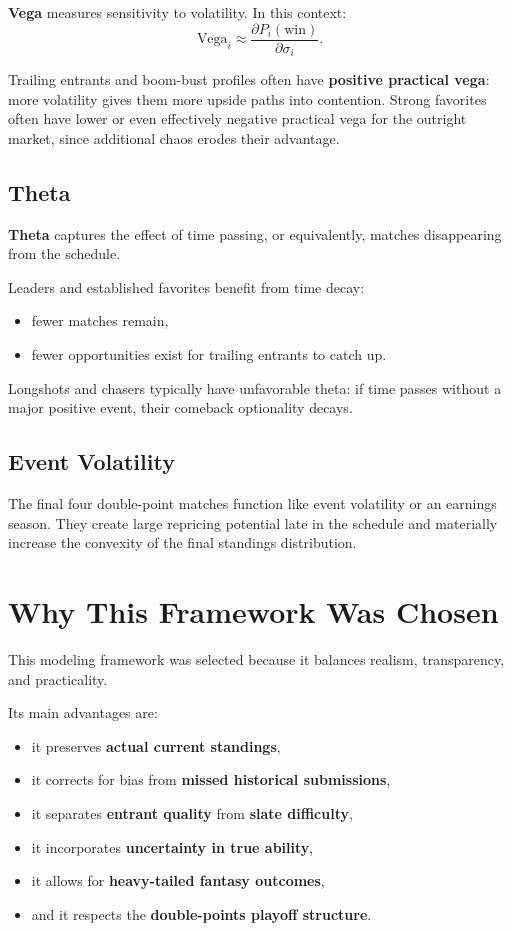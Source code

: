 \documentclass[11pt]{article}
\begin{document}
\textbf{Vega} measures sensitivity to volatility. In this context:
$$
\text{Vega}_i \approx \frac{\partial P_i(\text{win})}{\partial \sigma_i}.
$$

Trailing entrants and boom-bust profiles often have \textbf{positive practical vega}: more volatility gives them more upside paths into contention. Strong favorites often have lower or even effectively negative practical vega for the outright market, since additional chaos erodes their advantage.

\subsection{Theta}

\textbf{Theta} captures the effect of time passing, or equivalently, matches disappearing from the schedule.

Leaders and established favorites benefit from time decay:
\begin{itemize}[itemsep=2pt]
    \item fewer matches remain,
    \item fewer opportunities exist for trailing entrants to catch up.
\end{itemize}

Longshots and chasers typically have unfavorable theta: if time passes without a major positive event, their comeback optionality decays.

\subsection{Event Volatility}

The final four double-point matches function like event volatility or an earnings season. They create large repricing potential late in the schedule and materially increase the convexity of the final standings distribution.

\section{Why This Framework Was Chosen}

This modeling framework was selected because it balances realism, transparency, and practicality.

Its main advantages are:
\begin{itemize}[itemsep=2pt]
    \item it preserves \textbf{actual current standings},
    \item it corrects for bias from \textbf{missed historical submissions},
    \item it separates \textbf{entrant quality} from \textbf{slate difficulty},
    \item it incorporates \textbf{uncertainty in true ability},
    \item it allows for \textbf{heavy-tailed fantasy outcomes},
    \item and it respects the \textbf{double-points playoff structure}.
\end{itemize}
\end{document}
